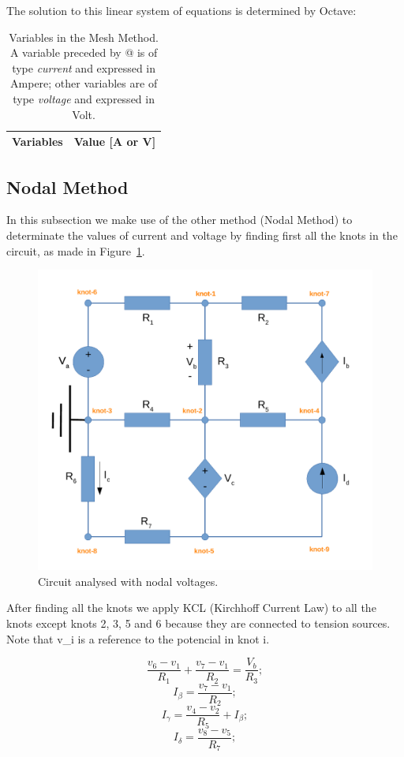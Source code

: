 The solution to this linear system of equations is determined by Octave:

\begin{table}[h]
  \centering
  \begin{tabular}{|l|r|}
    \hline    
    {\bf Variables} & {\bf Value [A or V]} \\ \hline
    
  \end{tabular}
  \caption{Variables in the Mesh Method. A variable preceded by @ is of type {\em current} and expressed in Ampere; other variables are of type {\em voltage} and expressed in Volt.}
  \label{tab:malhas}
\end{table}

\subsection{Nodal Method}

In this subsection we make use of the other method (Nodal Method) to determinate the values of current and voltage by finding first all the knots in the circuit, as made in Figure~\ref{fig:Circuit_Nodal}.

\begin{figure}[H] 
\centering
\includegraphics[width=0.5\linewidth]{CircuitNodal.pdf}
\caption{Circuit analysed with nodal voltages.}
\label{fig:Circuit_Nodal}
\end{figure}

After finding all the knots we apply KCL (Kirchhoff Current Law) to all the knots except knots 2, 3, 5 and 6 because they are connected to tension sources.
Note that v_i is a reference to the potencial in knot i.

\begin{equation}
  \frac{v_6-v_1}{R_1} + \frac{v_7-v_1}{R_2} = \frac{V_b}{R_3};
\end{equation}
\begin{equation}
  I_{\beta} = \frac{v_7-v_1}{R_2};	
\end{equation}
\begin{equation}
  I_{\gamma} = \frac{v_4-v_2}{R_5}+I_{\beta};
\end{equation}
\begin{equation}
  I_{\delta} = \frac{v_8-v_5}{R_7};
\end{equation}

